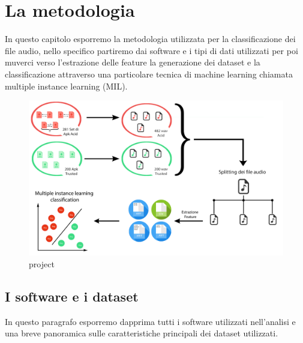\chapter{La metodologia}
In questo capitolo esporremo la metodologia utilizzata per la classificazione dei file audio, nello specifico partiremo dai software e i tipi di dati utilizzati per poi muverci verso l'estrazione delle feature la generazione dei dataset e la classificazione attraverso una particolare tecnica di machine learning chiamata multiple instance learning (MIL). 
\begin{figure}[h]
\centering
    \includegraphics[width=0.9\linewidth]{imgs/capitolo4/all.png} 
    \caption{project}
    \label{fig:all}
\end{figure}
\FloatBarrier
\section{I software e i dataset}
In questo paragrafo esporremo dapprima tutti i software utilizzati nell'analisi e una breve panoramica sulle caratteristiche principali dei dataset utilizzati.  
